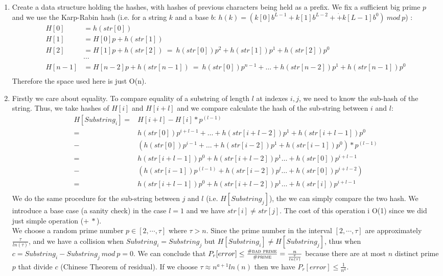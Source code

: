 \documentclass[a4paper]{article}
\begin{document}
\begin{enumerate}
\item Create a data structure holding the hashes, with hashes of previous characters being held as a prefix. We fix a sufficient big prime $p$ and we use the Karp-Rabin hash (i.e. for a string $k$ and a base $b$: $h(k) = (k[0]b^{L−1} + k[1]b^{L−2}+ \dot+ k [L − 1]b^0) \ mod\  p $) :
\begin{align*}
        H[0]&   = h(str[0]) \\
        H[1]&   = H[0]  p + h(str[1])\\
        H[2]&   = H[1]  p + h(str[2]) \ = \ h(str[0]) p^2 + h(str[1]) p^1 +h(str[2])p^0\\
        &\cdots  \\
        H[n-1]& = H[n-2]  p + h(str[n-1]) \ = \  h(str[0]) p^{n-1} +  \dots  +h(str[n-2]) p^1 + h(str[n-1])p^0\\ 
\end{align*}
Therefore the space used here is just O(n).
\item Firstly we care about equality. To compare equality of a substring of length $l$ at indexes $i, j$, we need to know the sub-hash of the string. Thus, we take hashes of $H[i]$ and $H[i+l]$ and we compare calculate the hash of the sub-string between $i$ and $l$:
\begin{align*}
H[Substring_i] = &H[i + l] - H[i] * p ^{(l - 1)}\\
=&h(str[0]) p^{i + l-1} +  \dots  +h(str[i + l-2]) p^1 + h(str[i + l-1])p^0\\
-& (h(str[0]) p^{i-1} +  \dots  +h(str[i-2]) p^1 + h(str[i-1])p^0)* p ^{(l - 1)}\\
=& h(str[i + l-1])p^0+h(str[i + l-2]) p^1\dots +h(str[0]) p^{i + l-1}  \\
-& (h(str[i-1])p^{(l - 1)} +h(str[i-2]) p^{l}\dots +h(str[0]) p^{i+l - 2}    )\\
=& h(str[i + l-1])p^0+h(str[i + l-2]) p^1\dots +h(str[i]) p^{i + l-1}  \\   
\end{align*}
We do the same procedure for the sub-string between $j$ and $l$ (i.e. $H[Substring_j]$), the we can simply compare the two hash. We introduce a base case (a sanity check) in the case $l=1$ and we have $str[i] \neq str[j]$. The cost of this operation i O(1) since we did just simple operation ($+ \ *$).\\
We choose a random prime number $p\in [2,\cdots,\tau]$ where $\tau > n$. Since the prime number in the interval $[2,\cdots,\tau]$ are approximately $ \frac{\tau}{ln(\tau)}$, and we have a collision when $Substring_i=Substring_j$ but $H[Substring_i]\neq H[Substring_j]$, thus when $c= Substring_i- Substring_j \ mod \ p=0$. We can conclude that $P_r[error] \leq \frac{\textsc{\#bad prime}}{\textsc{\#prime}}= \frac{n}{\frac{\tau}{ln(\tau)}}$ because there are at most $n$ distinct prime $p$ that divide $c$ (Chinese Theorem of residual). If we choose $\tau \approx n^{a+1} ln(n)$ then we have $P_r[error] \leq \frac{1}{n^a}$.

\end{enumerate}
\end{document}
